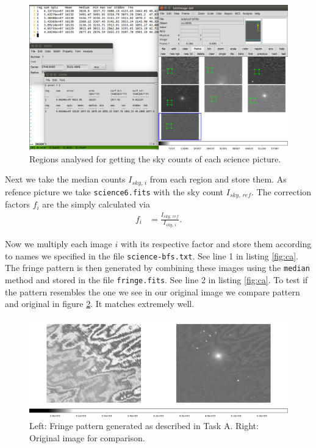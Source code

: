 \documentclass[11pt,a4paper,twoside]{article}
\begin{document}
\begin{figure}[h!]
\centering
\includegraphics[width=\linewidth]{./pic/regions}
\caption{Regions analysed for getting the sky counts of each science picture.}
\label{fig:reg}
\end{figure}

Next we take the median counts $I_{sky,\,i}$ from each region and store them.
As refence picture we take \verb+science6.fits+ with the sky count $I_{sky,\,ref}$.
The correction factors $f_i$ are the simply calculated via
\begin{align}
    f_i &= \frac{I_{sky,\,ref}}{I_{sky,\,i}} .
\end{align}

Now we multiply each image $i$ with its respective factor and store them
according to names we specified in the file \verb+science-bfs.txt+.
See line 1 in listing \ref{fig:ca}. The fringe pattern is then generated
by combining these images using the \verb+median+ method and stored in the
file \verb+fringe.fits+. See line 2 in listing \ref{fig:ca}. To test if the
pattern resembles the one we see in our original image we compare pattern
and original in figure \ref{fig:fr}. It matches extremely well.

\begin{figure}[h!]
\centering
\includegraphics[width=\linewidth]{./pic/fringes}
\caption{Left: Fringe pattern generated as described in Task A. Right:
         Original image for comparison.}
\label{fig:fr}
\end{figure}
\end{document}
